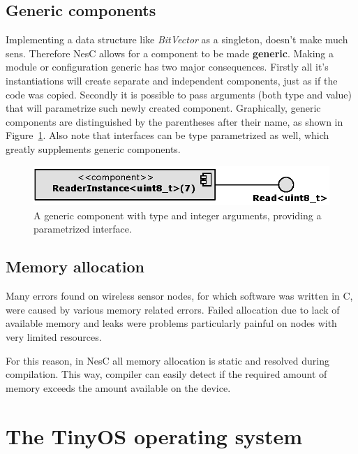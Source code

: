 \subsection{Generic components}

Implementing a data structure like \emph{BitVector} as a singleton,
doesn't make much sens. Therefore NesC allows for a component to be
made {\bf generic}. Making a module or configuration generic has two
major consequences.  Firstly all it's instantiations will create
separate and independent components, just as if the code was copied.
Secondly it is possible to pass arguments (both type and value) that
will parametrize such newly created component. Graphically, generic
components are distinguished by the parentheses after their name, as
shown in Figure~\ref{fig:generic_component}. Also note that interfaces
can be type parametrized as well, which greatly supplements generic
components.

\begin{figure}[h]
  \centering
  \includegraphics{diagrams/generic_component.eps}
  \caption{A generic component with type and integer arguments,
  providing a parametrized interface.}
  \label{fig:generic_component}
\end{figure}

\subsection{Memory allocation}
Many errors found on wireless sensor nodes, for which software was
written in C, were caused by various memory related errors. Failed
allocation due to lack of available memory and leaks were problems
particularly painful on nodes with very limited resources.

For this reason, in NesC all memory allocation is static and resolved
during compilation. This way, compiler can easily detect if the
required amount of memory exceeds the amount available on the device.

\section{The TinyOS operating system}

